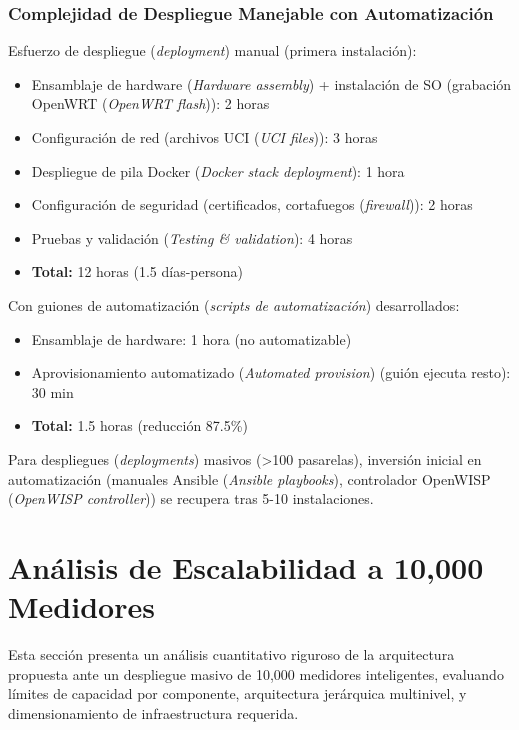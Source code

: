 \subsubsection{Complejidad de Despliegue Manejable con Automatización}

Esfuerzo de despliegue (\textit{deployment}) manual (primera instalación):

\begin{itemize}
\item Ensamblaje de hardware (\textit{Hardware assembly}) + instalación de SO (grabación OpenWRT (\textit{OpenWRT flash})): 2 horas
\item Configuración de red (archivos UCI (\textit{UCI files})): 3 horas
\item Despliegue de pila Docker (\textit{Docker stack deployment}): 1 hora
\item Configuración de seguridad (certificados, cortafuegos (\textit{firewall})): 2 horas
\item Pruebas y validación (\textit{Testing \& validation}): 4 horas
\item \textbf{Total:} 12 horas (1.5 días-persona)
\end{itemize}

Con guiones de automatización (\textit{scripts de automatización}) desarrollados:

\begin{itemize}
\item Ensamblaje de hardware: 1 hora (no automatizable)
\item Aprovisionamiento automatizado (\textit{Automated provision}) (guión ejecuta resto): 30 min
\item \textbf{Total:} 1.5 horas (reducción 87.5\%)
\end{itemize}

Para despliegues (\textit{deployments}) masivos (>100 pasarelas), inversión inicial en automatización (manuales Ansible (\textit{Ansible playbooks}), controlador OpenWISP (\textit{OpenWISP controller})) se recupera tras 5-10 instalaciones.

\section{Análisis de Escalabilidad a 10,000 Medidores}

Esta sección presenta un análisis cuantitativo riguroso de la arquitectura propuesta ante un despliegue masivo de 10,000 medidores inteligentes, evaluando límites de capacidad por componente, arquitectura jerárquica multinivel, y dimensionamiento de infraestructura requerida.

